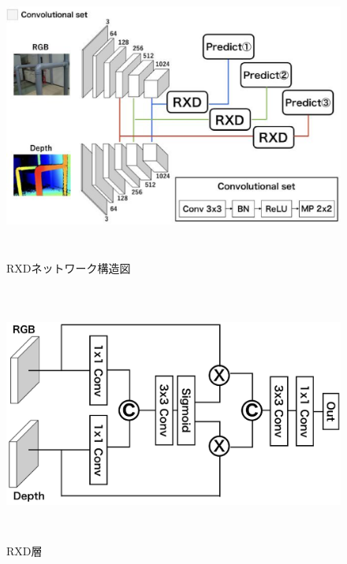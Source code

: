 \clearpage

\begin{figure}[htbt]
	\centering
	 \includegraphics[height=95mm]{rxdnet.eps}
	 \caption{RXDネットワーク構造図}
	 \label{fig:f2}
\end{figure}

\begin{figure}[htbt]
	\centering
	 \includegraphics[height=85mm]{RDXa.eps}
	 \caption{RXD層}
	 \label{fig:f2}
\end{figure}

